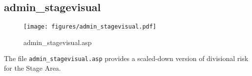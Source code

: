 \subsection{admin\_stagevisual}
\begin{figure}[htb]
    \begin{center}
        \texttt{[image: figures/admin\_stagevisual.pdf]}
    \end{center}
    \caption{admin\_stagevisual.asp}
    \label{fig:admin_stagevisual}
\end{figure}

The file \verb|admin_stagevisual.asp| provides a scaled-down version of
divisional risk for the Stage Area.
